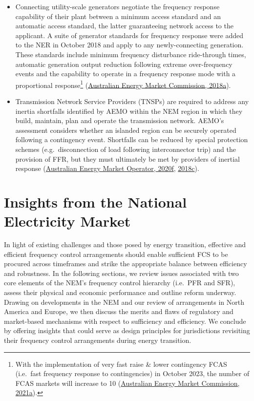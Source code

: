 \documentclass[12pt,a4paper,]{report}
\begin{document}
\begin{itemize}
\item
  Connecting utility-scale generators negotiate the frequency response
  capability of their plant between a minimum access standard and an
  automatic access standard, the latter guaranteeing network access to
  the applicant. A suite of generator standards for frequency response
  were added to the NER in October 2018 and apply to any
  newly-connecting generation. These standards include minimum frequency
  disturbance ride-through times, automatic generation output reduction
  following extreme over-frequency events and the capability to operate
  in a frequency response mode with a proportional response\footnote{With
    the implementation of very fast raise \& lower contingency FCAS
    (i.e.~fast frequency response to contingencies) in October 2023, the
    number of FCAS markets will increase to 10
    (\protect\hyperlink{ref-australianenergymarketcommissionFastFrequencyResponse2021}{Australian
    Energy Market Commission, 2021a}).}
  (\protect\hyperlink{ref-australianenergymarketcommissionGeneratorTechnicalPerformance2018}{Australian
  Energy Market Commission, 2018a}).
\item
  Transmission Network Service Providers (TNSPs) are required to address
  any inertia shortfalls identified by AEMO within the NEM region in
  which they build, maintain, plan and operate the transmission network.
  AEMO's assessment considers whether an islanded region can be securely
  operated following a contingency event. Shortfalls can be reduced by
  special protection schemes (e.g.~disconnection of load following
  interconnector trip) and the provision of FFR, but they must
  ultimately be met by providers of inertial response
  (\protect\hyperlink{ref-australianenergymarketoperatorNoticeSouthAustralia2020}{Australian
  Energy Market Operator, 2020f},
  \protect\hyperlink{ref-australianenergymarketoperatorInertiaRequirementsMethodology2018}{2018c}).
\end{itemize}

\hypertarget{sec:fcs-insights}{%
\section{Insights from the National Electricity
Market}\label{sec:fcs-insights}}

In light of existing challenges and those posed by energy transition,
effective and efficient frequency control arrangements should enable
sufficient FCS to be procured across timeframes and strike the
appropriate balance between efficiency and robustness. In the following
sections, we review issues associated with two core elements of the
NEM's frequency control hierarchy (i.e.~PFR and SFR), assess their
physical and economic performance and outline reform underway. Drawing
on developments in the NEM and our review of arrangements in North
America and Europe, we then discuss the merits and flaws of regulatory
and market-based mechanisms with respect to sufficiency and efficiency.
We conclude by offering insights that could serve as design principles
for jurisdictions revisiting their frequency control arrangements during
energy transition.
\end{document}
